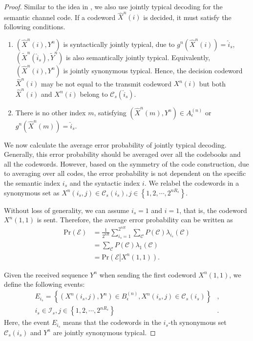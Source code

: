 \documentclass[12pt, draftclsnofoot,onecolumn]{IEEEtran}
\begin{document}
\begin{proof}
Similar to the idea in \cite{Book_Cover}, we also use jointly typical decoding for the semantic channel code. If a codeword $\hat{X}^n(i)$ is decided, it must satisfy the following conditions.
\begin{enumerate}
   \item $(\hat{X}^n(i),Y^n)$ is syntactically jointly typical, due to $g^n(\hat{X}^n(i))=\hat{i}_s$, $(\tilde{X}^n(\hat{i}_s),\tilde{Y}^n)$ is also semantically jointly typical. Equivalently, $(\hat{X}^n(i),Y^n)$ is jointly synonymous typical. Hence, the decision codeword $\hat{X}^n(i)$ may be not equal to the transmit codeword $X^n(i)$ but both $\hat{X}^n(i)$ and $X^n(i)$ belong to $\mathcal{C}_s(\hat{i}_s)$.
   \item There is no other index $m$, satisfying $(\hat{X}^n(m),Y^n) \in A_{\epsilon}^{(n)}$ or $g^n(\hat{X}^n(m))=\hat{i}_s$.
\end{enumerate}

We now calculate the average error probability of jointly typical decoding. Generally, this error probability should be averaged over all the codebooks and all the codewords. However, based on the symmetry of the code construction, due to averaging over all codes, the error probability is not dependent on the specific the semantic index $i_s$ and the syntactic index $i$. We relabel the codewords in a synonymous set as $X^n(i_s,j)\in \mathcal{C}_s(i_s), j\in \left\{1,2,\cdots,2^{nR_s}\right\}$.

Without loss of generality, we can assume $i_s=1$ and $i=1$, that is, the codeword $X^n(1,1)$ is sent. Therefore, the average error probability can be written as
\begin{equation}
\begin{aligned}
\text{Pr}(\mathcal{E})&=\frac{1}{2^{nR}}\sum_{i_s=1}^{2^{nR}}\sum_{\mathcal{C}}P(\mathcal{C})\lambda_{i_s}(\mathcal{C})\\
&=\sum_{\mathcal{C}}P(\mathcal{C})\lambda_{1}(\mathcal{C})\\
&=\text{Pr}\left(\mathcal{E}\left|X^{n}(1,1)\right.\right).
\end{aligned}
\end{equation}

Given the received sequence $Y^n$ when sending the first codeword $X^n(1,1)$, we define the following events:
\begin{equation}
\begin{aligned}
E_{i_s}=\left\{\left(X^n(i_s,j),Y^n\right)\in B_{\epsilon}^{(n)}, X^n(i_s,j)\in \mathcal{C}_s(i_s)\right\}&,\\
i_s\in \mathcal{I}_s, j\in \left\{1,2,\cdots,2^{nR_s}\right\}&.
\end{aligned}
\end{equation}
Here, the event $E_{i_s}$ means that the codewords in the $i_s$-th synonymous set $ \mathcal{C}_s(i_s)$ and $Y^n$ are jointly synonymous typical.


\end{proof}
\end{document}
